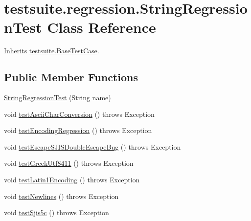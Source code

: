 \hypertarget{classtestsuite_1_1regression_1_1_string_regression_test}{}\section{testsuite.\+regression.\+String\+Regression\+Test Class Reference}
\label{classtestsuite_1_1regression_1_1_string_regression_test}


Inherits \mbox{\hyperlink{classtestsuite_1_1_base_test_case}{testsuite.\+Base\+Test\+Case}}.

\subsection*{Public Member Functions}
\begin{DoxyCompactItemize}
\item 
\mbox{\hyperlink{classtestsuite_1_1regression_1_1_string_regression_test_a74cdd190073561c8807d281869ac10c5}{String\+Regression\+Test}} (String name)
\item 
void \mbox{\hyperlink{classtestsuite_1_1regression_1_1_string_regression_test_a5a8cfa1befdedece1a323e0b37658e39}{test\+Ascii\+Char\+Conversion}} ()  throws Exception 
\item 
void \mbox{\hyperlink{classtestsuite_1_1regression_1_1_string_regression_test_a38cab96afa2172965f228e78ad15fdec}{test\+Encoding\+Regression}} ()  throws Exception 
\item 
void \mbox{\hyperlink{classtestsuite_1_1regression_1_1_string_regression_test_aed5d3525cb076428271b0166d5537e83}{test\+Escape\+S\+J\+I\+S\+Double\+Escape\+Bug}} ()  throws Exception 
\item 
void \mbox{\hyperlink{classtestsuite_1_1regression_1_1_string_regression_test_a8a0195ab620f64bccaf9f34841536e70}{test\+Greek\+Utf8411}} ()  throws Exception 
\item 
void \mbox{\hyperlink{classtestsuite_1_1regression_1_1_string_regression_test_abcc37c5fb4c57b3f201afaadbc55ee13}{test\+Latin1\+Encoding}} ()  throws Exception 
\item 
void \mbox{\hyperlink{classtestsuite_1_1regression_1_1_string_regression_test_a5e1296ac09b9d40f0116a776de542e0a}{test\+Newlines}} ()  throws Exception 
\item 
void \mbox{\hyperlink{classtestsuite_1_1regression_1_1_string_regression_test_a79556638c7ab71bef596c339006c2e19}{test\+Sjis5c}} ()  throws Exception 
\item 

\end{DoxyCompactItemize}
